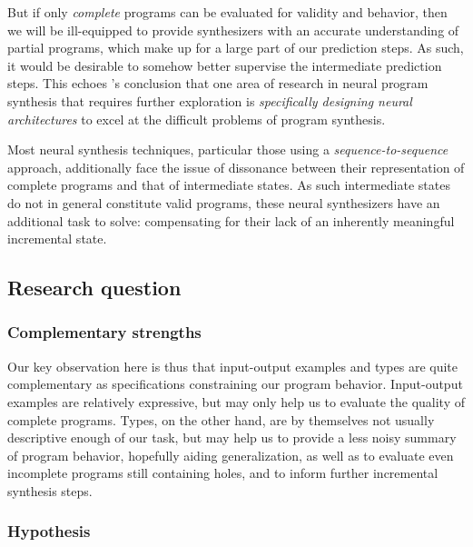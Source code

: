 \documentclass{article}
\begin{document}
But if only \emph{complete} programs can be evaluated for validity and behavior, then 
we will be ill-equipped to provide synthesizers with an accurate understanding of partial programs,
which make up for a large part of our prediction steps.
As such, it would be desirable to somehow better supervise the intermediate prediction steps.
This echoes \citet{nps}'s conclusion that one area of research in neural program synthesis that requires further exploration is
\emph{specifically designing neural architectures} to excel at the difficult problems of program synthesis.


Most neural synthesis techniques, particular those using a \emph{sequence-to-sequence} approach,
additionally face the issue of dissonance between their representation of complete programs and that of intermediate states.
As such intermediate states do not in general constitute valid programs,
these neural synthesizers have an additional task to solve:
compensating for their lack of an inherently meaningful incremental state.

\subsection{Research question}

\subsubsection{Complementary strengths}

Our key observation here is thus that input-output examples and types are quite complementary as specifications constraining our program behavior.
Input-output examples are relatively expressive,
but may only help us to evaluate the quality of complete programs.
Types, on the other hand, are by themselves not usually descriptive enough of our task,
but may help us to provide a less noisy summary of program behavior, hopefully aiding generalization,
as well as to evaluate even incomplete programs still containing holes,
and to inform further incremental synthesis steps.

\subsubsection{Hypothesis}
\end{document}
